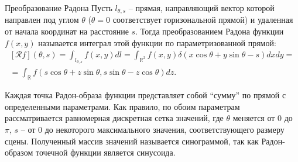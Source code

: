 
\begin{definition}{Преобразование Радона}
    Пусть $l_{\theta, s}$ -- прямая, направляющий вектор которой направлен под углом $\theta$ ($\theta = 0$ соответствует горизональной прямой) и удаленная от начала координат на расстояние $s$. Тогда преобразованием Радона функции $f(x, y)$ называется интеграл этой функции по параметризованной прямой:
    \begin{gather*}
        \left[ \mathcal{R}f \right](\theta, s) =
        \int_{l_{\theta, s}} f(x, y) dl =
        \int_{\mathbb{R}^2} f(x, y) \delta(x \cos \theta + y \sin \theta - s) dx dy =\\=
        \int_{\mathbb{R}} f(s\cos\theta + z\sin\theta, s\sin\theta - z\cos\theta) dz.
    \end{gather*}
\end{definition}

Каждая точка Радон-образа функции представляет собой ``сумму'' по прямой с определенными параметрами. Как правило, по обоим параметрам рассматривается равномерная дискретная сетка значений, где $\theta$ меняется от $0$ до $\pi$, $s$ -- от $0$ до некоторого максимального значения, соответствующего размеру сцены. Полученный массив значений называется синограммой, так как Радон-образом точечной функции является синусоида.
